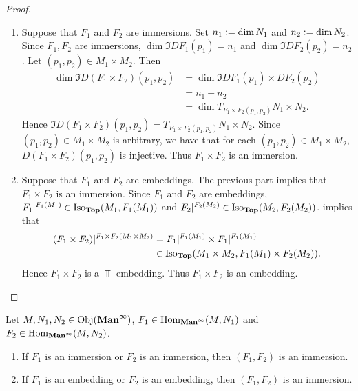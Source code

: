 \documentclass{book}
\begin{document}
\begin{proof}\
	\begin{enumerate}
		\item Suppose that $F_1$ and $F_2$ are immersions. Set $n_1 \vcentcolon= \dim N_1$ and $n_2 \vcentcolon= \dim N_2$. Since $F_1, F_2$ are immersions, $\dim \Im DF_1(p_1) = n_1$ and $\dim \Im DF_2(p_2) = n_2$. Let $(p_1, p_2) \in M_1 \times M_2$. Then 
		\begin{align*}
			\dim \Im D(F_1 \times F_2)(p_1, p_2)
			& = \dim \Im DF_1(p_1) \times  DF_2(p_2) \\
			& = n_1 + n_2 \\
			& = \dim T_{F_1 \times F_2(p_1, p_2)} N_1 \times N_2.
		\end{align*} 
		Hence $\Im D(F_1 \times F_2)(p_1, p_2) = T_{F_1 \times F_2(p_1, p_2)} N_1 \times N_2$. Since $(p_1, p_2) \in M_1 \times M_2$ is arbitrary, we have that for each $(p_1, p_2) \in M_1 \times M_2$, $D(F_1 \times F_2)(p_1, p_2)$ is injective. Thus $F_1 \times F_2$ is an immersion.
		\item Suppose that $F_1$ and $F_2$ are embeddings. The previous part implies that $F_1 \times F_2$ is an immersion. Since $F_1$ and $F_2$ are embeddings, $F_1|^{F_1(M_1)} \in \operatorname{Iso}_{\operatorname*{\text{\textbf{Top}}}}(M_1, F_1(M_1))$ and $F_2|^{F_2(M_2)} \in \operatorname{Iso}_{\operatorname*{\text{\textbf{Top}}}}(M_2, F_2(M_2))$. \rex{}  implies that 
		\begin{align*}
			(F_1 \times F_2)|^{F_1 \times F_2(M_1 \times M_2)} 
			& = F_1|^{F_1(M_1)} \times F_1|^{F_1(M_1)} \\
			& \in \operatorname{Iso}_{\operatorname*{\text{\textbf{Top}}}}( M_1 \times M_2, F_1(M_1) \times F_2(M_2)).
		\end{align*}
		Hence $F_1 \times F_2$ is a $\Top$-embedding. Thus $F_1 \times F_2$ is an embedding.
	\end{enumerate}
\end{proof}

\begin{ex} 
	Let $M, N_1, N_2 \in \operatorname{Obj}(\operatorname*{\text{\textbf{Man}}^{\infty}})$, $F_1 \in \operatorname{Hom}_{\operatorname*{\text{\textbf{Man}}^{\infty}}}(M, N_1)$ and $F_2 \in \operatorname{Hom}_{\operatorname*{\text{\textbf{Man}}^{\infty}}}(M, N_2)$. 
	\begin{enumerate}
		\item If $F_1$ is an immersion or $F_2$ is an immersion, then $(F_1, F_2)$ is an immersion. 
		\item If $F_1$ is an embedding or $F_2$ is an embedding, then $(F_1, F_2)$ is an immersion. 
	\end{enumerate}
\end{ex}
\end{document}
